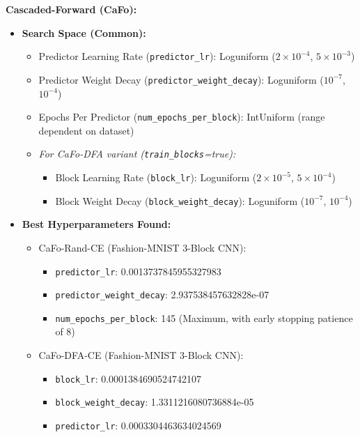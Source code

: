 \documentclass[11pt, english]{article}
\begin{document}
\textbf{Cascaded-Forward (CaFo):}
\begin{itemize}
    \item \textbf{Search Space (Common):}
        \begin{itemize}
            \item Predictor Learning Rate (\texttt{predictor\_lr}): Loguniform ($2 \times 10^{-4}$, $5 \times 10^{-3}$)
            \item Predictor Weight Decay (\texttt{predictor\_weight\_decay}): Loguniform ($10^{-7}$, $10^{-4}$)
            \item Epochs Per Predictor (\texttt{num\_epochs\_per\_block}): IntUniform (range dependent on dataset)
            \item \textit{For CaFo-DFA variant (\texttt{train\_blocks}=true):}
                \begin{itemize}
                    \item Block Learning Rate (\texttt{block\_lr}): Loguniform ($2 \times 10^{-5}$, $5 \times 10^{-4}$)
                    \item Block Weight Decay (\texttt{block\_weight\_decay}): Loguniform ($10^{-7}$, $10^{-4}$)
                \end{itemize}
        \end{itemize}
    \item \textbf{Best Hyperparameters Found:}
        \begin{itemize}
            \item CaFo-Rand-CE (Fashion-MNIST 3-Block CNN):
                \begin{itemize}
                    \item \texttt{predictor\_lr}: 0.0013737845955327983
                    \item \texttt{predictor\_weight\_decay}: 2.937538457632828e-07
                    \item \texttt{num\_epochs\_per\_block}: 145 (Maximum, with early stopping patience of 8)
                \end{itemize}
            \item CaFo-DFA-CE (Fashion-MNIST 3-Block CNN):
                 \begin{itemize}
                     \item \texttt{block\_lr}: 0.0001384690524742107
                     \item \texttt{block\_weight\_decay}: 1.3311216080736884e-05
                     \item \texttt{predictor\_lr}: 0.0003304463634024569

\end{itemize}
\end{itemize}
\end{itemize}
\end{document}
